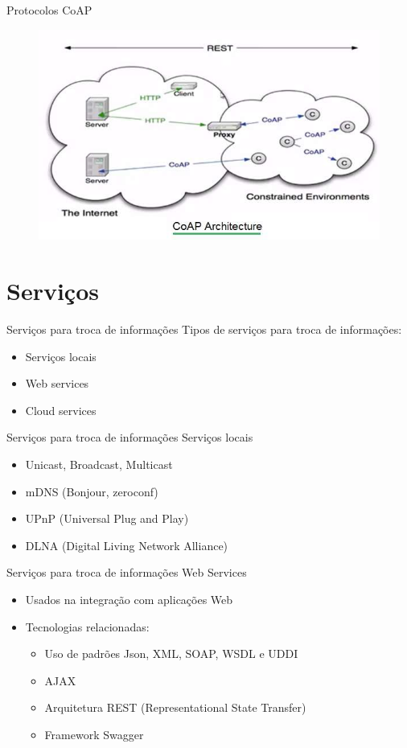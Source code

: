 \documentclass[t]{beamer}
\begin{document}
\begin{frame}{Protocolos}
CoAP
\begin{figure}
	\includegraphics[width=\linewidth]{CoAP-Architecture}
\end{figure}
\end{frame}
\frame{\titlepage}

\section{Serviços}

\begin{frame}{Serviços para troca de informações}
Tipos de serviços para troca de informações:
\begin{itemize}
	\item Serviços locais
	\item Web services
	\item Cloud services
\end{itemize}
\end{frame}

\begin{frame}{Serviços para troca de informações}
Serviços locais
\begin{itemize}
	\item Unicast, Broadcast, Multicast
	\item mDNS (Bonjour, zeroconf)
	\item UPnP (Universal Plug and Play) 
	\item DLNA (Digital Living Network Alliance)
\end{itemize}
\end{frame}

\begin{frame}{Serviços para troca de informações}
Web Services
\begin{itemize}
	\item Usados na integração com aplicações Web
	\item Tecnologias relacionadas:
	\begin{itemize}
		\item Uso de padrões Json, XML, SOAP, WSDL e UDDI
		\item AJAX
		\item Arquitetura REST (Representational State Transfer)
		\item Framework Swagger	
	\end{itemize}	
\end{itemize}
\end{frame}
\end{document}
